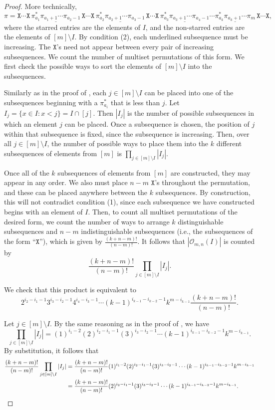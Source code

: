 \documentclass[reqno]{amsart}
\newcommand{\X}{\texttt{X}}
\newcommand{\al}[1]{\begin{align*} #1 \end{align*}}
\theoremstyle{definition}
\theoremstyle{remark}
\begin{document}
\begin{proof}
More technically,
\[
\pi = \X \cdots \X \, \underline{\pi_{a_1}^* \pi_{a_1+1} \cdots \pi_{a_2-1}}\,\X \cdots \X \,\underline{\pi_{a_2}^* \pi_{a_2+1} \cdots \pi_{a_3-1}} \,\X \cdots \X  \,\underline{\pi_{a_3}^* \pi_{a_3+1} \cdots \pi_{a_4-1}}\cdots \underline{\pi_{a_k}^* \pi_{a_k+1} \cdots \pi_{m}} \,\X \cdots \X ,
\]
where the starred entries are the elements of $I$, and the non-starred entries are the elements of $[m] \setminus I$. By condition (2), each underlined subsequence must be increasing. The $\X$'s need not appear between every pair of increasing subsequences.
We count the number of multiset permutations of this form.
We first check the possible ways to sort the elements of $[m]\setminus I$ into the subsequences.

Similarly as in the proof of , each $j \in [m]\setminus I$ can be placed into one of the subsequences beginning with a $\pi_{a_i}^*$ that is less than $j$. Let $I_j = \{x\in I: x<j\} = I \cap [j]$. Then $|I_j|$ is the number of possible subsequences in which an element $j$ can be placed.
Once a subsequence is chosen, the position of $j$ within that subsequence is fixed, since the subsequence is increasing.
Then, over all $j\in [m]\setminus I$, the number of possible ways to place them into the $k$ different subsequences of elements from $[m]$ is $\prod_{j \in [m]\setminus I} |I_j|$.


Once all of the $k$ subsequences of elements from $[m]$ are constructed, they may appear in any order. 
We also must place $n-m$ $\X$'s throughout the permutation, and these can be placed anywhere between the $k$ subsequences. By construction, this will not contradict condition (1), since each subsequence we have constructed begins with an element of $I$.
Then, to count all multiset permutations of the desired form, we count the number of ways to arrange $k$ distinguishable subsequences and $n-m$ indistinguishable subsequences (i.e., the subsequences of the form ``$\X$''), which is given by $\frac{(k+n-m)!}{(n-m)!}$.
It follows that $|\mathcal{O}_{m,n}(I)|$ is counted by
\[\frac{(k+n-m)!}{(n-m)!} \prod_{j\in [m]\setminus I} |I_j|.\]

We check that this product is equivalent to \[2^{i_2-i_1-1}3^{i_3-i_2-1}4^{i_4-i_3-1}\cdots (k-1)^{i_{k-1}-i_{k-2}-1}k^{m-i_{k-1}}\frac{(k+n-m)!}{(n-m)!}.\] 

Let $j \in [m]\setminus I$. By the same reasoning as in the proof of , we have 
\[
\prod_{j\in {[m]\setminus I}} |I_j| = (1)^{i_1-2}(2)^{i_2-i_1-1} (3)^{i_3-i_2-1} \cdots(k-1)^{i_{k-1}-i_{k-2}-1} k^{m-i_{k-1}}.
\]
By substitution, it follows that 
\al{
\frac{(k+n-m)!}{(n-m)!} \prod_{j\in [m]\setminus I} |I_j| &= \frac{(k+n-m)!}{(n-m)!} (1)^{i_1-2}(2)^{i_2-i_1-1}(3)^{i_3-i_2-1} \cdots(k-1)^{i_{k-1}-i_{k-2}-1} k^{m-i_{k-1}}\\
&= \frac{(k+n-m)!}{(n-m)!}(2)^{i_2-i_1-1}(3)^{i_3-i_2-1} \cdots(k-1)^{i_{k-1}-i_{k-2}-1} k^{m-i_{k-1}}.\qedhere
}
\end{proof}
\end{document}
